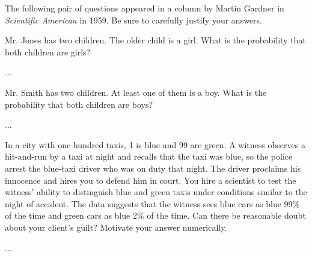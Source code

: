 \documentclass[a4paper,10pt,landscape,twocolumn]{scrartcl}
\begin{document}
\begin{exercise}
  The following pair of questions appeared in a column by Martin Gardner in
  \emph{Scientific American} in 1959. Be sure to carefully justify your
  answers.
  
  \begin{subex}
    Mr. Jones has two children. The older child is a girl. What is the
    probability that both children are girls?
  \end{subex}
  
  \begin{solution}
    ...  
  \end{solution}
  
  
  \begin{subex}
    Mr. Smith has two children. At least one of them is a boy. What is the
    probability that both children are boys?
  \end{subex}
  
  \begin{solution}
    ...  
  \end{solution}
  
\end{exercise}


\begin{exercise}[Taxi's]
  In a city with one hundred taxis, 1 is blue and 99 are green. A witness
  observes a hit-and-run by a taxi at night and recalls that the taxi was blue,
  so the police arrest the blue-taxi driver who was on duty that night. The
  driver proclaims his innocence and hires you to defend him in court. You hire
  a scientist to test the witness' ability to distinguish blue and green taxis
  under conditions similar to the night of accident. The data suggests that the
  witness sees blue cars as blue 99\% of the time and green cars as blue 2\% of
  the time. Can there be reasonable doubt about your client's guilt? Motivate
  your answer numerically.
  
  \begin{solution}
  ...  
  \end{solution}
\end{exercise}




\vfill\creditspracticequestions
\end{document}
